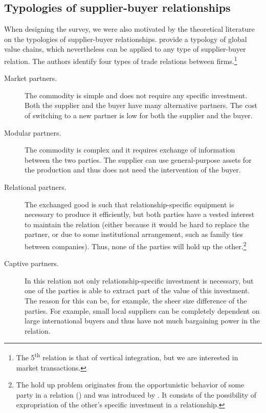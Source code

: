 \documentclass[final, dvipsnames, authoryear,12pt]{elsarticle}
\begin{document}
\subsection{Typologies of supplier-buyer relationships}
\label{sec:typologies}

When designing the survey, we were also motivated by the theoretical literature on the typologies of supplier-buyer relationships.  \cite{gereffi2005governance} provide a typology of global value chains, which nevertheless can be applied to any type of supplier-buyer relation. The authors identify four types of trade relations between firms.\footnote{The 5\textsuperscript{th} relation is that of vertical integration, but we are interested in market transactions.}

\begin{description}
    \item[Market partners.] The commodity is simple and does not require any specific investment. Both the supplier and the buyer have many alternative partners. The cost of switching to a new partner is low for both the supplier and the buyer.
    \item[Modular partners.] The commodity is complex and it requires exchange of information between the two parties. The supplier can use general-purpose assets for the production and thus does not need the intervention of the buyer.
    \item[Relational partners.] The exchanged good is such that relationship-specific equipment is necessary to produce it efficiently, but both parties have a vested interest to maintain the relation (either because it would be hard to replace the partner, or due to some institutional arrangement, such as family ties between companies). Thus, none of the parties will hold up the other.\footnote{The hold up problem originates from the opportunistic behavior of some party in a relation (\cite{williamson2007economic}) and was introduced by \cite{grossman1986costs}. It consists of the possibility of expropriation of the other's specific investment in a relationship.}
    \item[Captive partners.] In this relation not only relationship-specific investment is necessary, but one of the parties is able to extract part of the value of this investment. The reason for this can be, for example, the sheer size difference of the parties. For example, small local suppliers can be completely dependent on large international buyers and thus have not much bargaining power in the relation.
\end{description}
\end{document}
